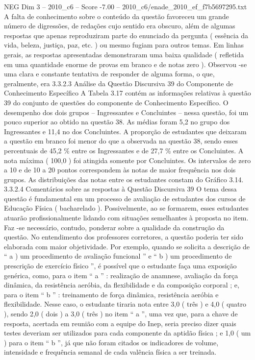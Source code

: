 \begin{textsample}{NEG Dim 3 – 2010\_c6 – Score -7.00 – 2010\_c6/enade\_2010\_ef\_f7b5697295.txt}
A falta de conhecimento sobre o conteúdo da questão favoreceu um grande número de digressões, de redações cujo sentido era obscuro, além de algumas respostas que apenas reproduziram parte do enunciado da pergunta ( essência da vida, beleza, justiça, paz, etc. ) ou mesmo fugiam para outros temas.
Em linhas gerais, as respostas apresentadas demonstraram uma baixa qualidade ( refletida em uma quantidade enorme de provas em branco e de notas zero ).
Observou -se uma clara e constante tentativa de responder de alguma forma, o que, geralmente, era 3.3.2.3 Análise da Questão Discursiva 39 do Componente de Conhecimento Específico A Tabela 3.17 contém as informações relativas à questão 39 do conjunto de questões do componente de Conhecimento Específico.
O desempenho dos dois grupos – Ingressantes e Concluintes – nessa questão, foi um pouco superior ao obtido na questão 38.
As médias foram 5,2 no grupo dos Ingressantes e 11,4 no dos Concluintes.
A proporção de estudantes que deixaram a questão em branco foi menor do que a observada na questão 38, sendo esses percentuais de 45,2 \% entre os Ingressantes e de 27,7 \% entre os Concluintes.
A nota máxima ( 100,0 ) foi atingida somente por Concluintes.
Os intervalos de zero a 10 e de 10 a 20 pontos correspondem às notas de maior frequência nos dois grupos.
As distribuições das notas entre os estudantes constam do Gráfico 3.14. 3.3.2.4 Comentários sobre as respostas à Questão Discursiva 39 O tema dessa questão é fundamental em um processo de avaliação de estudantes dos cursos de Educação Física ( bacharelado ).
Possivelmente, ao se formarem, esses estudantes atuarão profissionalmente lidando com situações semelhantes à proposta no item.
Faz -se necessário, contudo, ponderar sobre a qualidade da construção da questão.
No entendimento dos professores corretores, a questão poderia ter sido elaborada com maior objetividade.
Por exemplo, quando se solicita a descrição de “ a ) um procedimento de avaliação funcional ” e “ b ) um procedimento de prescrição de exercício físico ”, é possível que o estudante faça uma exposição genérica, como, para o item “ a ” : realização de anamnese, avaliação da força dinâmica, da resistência aeróbia, da flexibilidade e da composição corporal ; e, para o item “ b ” : treinamento de força dinâmica, resistência aeróbia e flexibilidade.
Nesse caso, o estudante tiraria nota entre 3,0 ( três ) e 4,0 ( quatro ), sendo 2,0 ( dois ) a 3,0 ( três ) no item “ a ”, uma vez que, para a chave de resposta, acertada em reunião com a equipe do Inep, seria preciso dizer quais testes deveriam ser utilizados para cada componente da aptidão física ; e 1,0 ( um ) para o item “ b ”, já que não foram citados os indicadores de volume, intensidade e frequência semanal de cada valência física a ser treinada.

\end{textsample}
